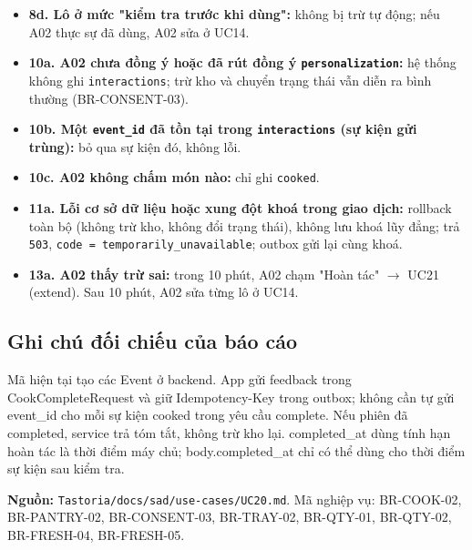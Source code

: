 \begin{itemize}
\item \textbf{8d. Lô ở mức "kiểm tra trước khi dùng":} không bị trừ tự động; nếu A02 thực sự đã dùng, A02 sửa ở UC14.
\item \textbf{10a. A02 chưa đồng ý hoặc đã rút đồng ý {\small\texttt{personalization}}:} hệ thống không ghi {\small\texttt{interactions}}; trừ kho và chuyển trạng thái vẫn diễn ra bình thường (BR-\allowbreak{}CONSENT-\allowbreak{}03).
\item \textbf{10b. Một {\small\texttt{event\_\allowbreak{}\allowbreak{}id}} đã tồn tại trong {\small\texttt{interactions}} (sự kiện gửi trùng):} bỏ qua sự kiện đó, không lỗi.
\item \textbf{10c. A02 không chấm món nào:} chỉ ghi {\small\texttt{cooked}}.
\item \textbf{11a. Lỗi cơ sở dữ liệu hoặc xung đột khoá trong giao dịch:} rollback toàn bộ (không trừ kho, không đổi trạng thái), không lưu khoá lũy đẳng; trả {\small\texttt{503}}, {\small\texttt{code = temporarily\_\allowbreak{}\allowbreak{}unavailable}}; outbox gửi lại cùng khoá.
\item \textbf{13a. A02 thấy trừ sai:} trong 10 phút, A02 chạm "Hoàn tác" \ensuremath{\rightarrow} UC21 (extend). Sau 10 phút, A02 sửa từng lô ở UC14.
\end{itemize}
\subsection{Ghi chú đối chiếu của báo cáo}
Mã hiện tại tạo các Event ở backend. App gửi feedback trong CookCompleteRequest và giữ Idempotency-\allowbreak{}Key trong outbox; không cần tự gửi event\_\allowbreak{}id cho mỗi sự kiện cooked trong yêu cầu complete. Nếu phiên đã completed, service trả tóm tắt, không trừ kho lại. completed\_\allowbreak{}at dùng tính hạn hoàn tác là thời điểm máy chủ; body.completed\_\allowbreak{}at chỉ có thể dùng cho thời điểm sự kiện sau kiểm tra.

\textbf{Nguồn:} {\small\texttt{Tastoria/\allowbreak{}\allowbreak{}docs/\allowbreak{}\allowbreak{}sad/\allowbreak{}\allowbreak{}use-\allowbreak{}cases/\allowbreak{}\allowbreak{}UC20.\allowbreak{}md}}. Mã nghiệp vụ: BR-\allowbreak{}COOK-\allowbreak{}02, BR-\allowbreak{}PANTRY-\allowbreak{}02, BR-\allowbreak{}CONSENT-\allowbreak{}03, BR-\allowbreak{}TRAY-\allowbreak{}02, BR-\allowbreak{}QTY-\allowbreak{}01, BR-\allowbreak{}QTY-\allowbreak{}02, BR-\allowbreak{}FRESH-\allowbreak{}04, BR-\allowbreak{}FRESH-\allowbreak{}05.

